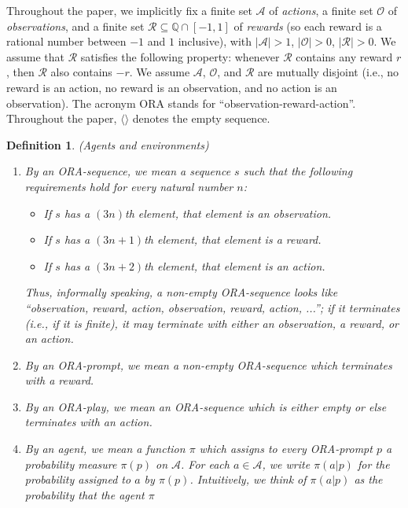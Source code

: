 \documentclass{article}
\newtheorem{definition}[theorem]{Definition}
\begin{document}
Throughout the paper, we implicitly
fix a finite set $\mathcal A$ of \emph{actions},
a finite set $\mathcal O$ of \emph{observations},
and a finite set $\mathcal R\subseteq \mathbb Q\cap [-1,1]$ of \emph{rewards}
(so each reward is a rational number between $-1$ and $1$ inclusive),
with $|\mathcal A|>1$,
$|\mathcal O|>0$, $|\mathcal R|>0$.
We assume that $\mathcal R$ satisfies the following property:
whenever $\mathcal R$ contains any reward $r$, then $\mathcal R$
also contains $-r$.
We assume $\mathcal A$, $\mathcal O$, and $\mathcal R$ are mutually disjoint
(i.e., no reward is an action, no reward is an observation, and no action is an
observation).
The acronym ORA stands for ``observation-reward-action''.
Throughout the paper, $\langle\rangle$ denotes the empty sequence.

\begin{definition}
    (Agents and environments)
    \begin{enumerate}
        \item
        By an \emph{ORA-sequence}, we mean a sequence $s$ such that the following requirements
        hold for every natural number $n$:
        \begin{itemize}
            \item If $s$ has a $(3n)$th element, that element is an observation.
            \item If $s$ has a $(3n+1)$th element, that element is a reward.
            \item If $s$ has a $(3n+2)$th element, that element is an action.
        \end{itemize}
        Thus, informally speaking, a non-empty ORA-sequence
        looks like ``observation, reward, action, observation, reward, action, ...'';
        if it terminates (i.e., if it is finite), it may terminate with
        either an observation, a reward, or an action.
        \item
        By an \emph{ORA-prompt}, we mean a non-empty ORA-sequence which
        terminates with a reward.
        \item
        By an \emph{ORA-play}, we mean an ORA-sequence which is either empty or else
        terminates with an action.
        \item
        By an \emph{agent}, we mean a function $\pi$ which assigns to every
        ORA-prompt $p$ a probability measure $\pi(p)$ on $\mathcal A$.
        For each $a\in\mathcal A$,
        we write $\pi(a|p)$ for the probability assigned to $a$ by $\pi(p)$.
        Intuitively, we think of $\pi(a|p)$ as the probability that the agent $\pi$

\end{enumerate}
\end{definition}
\end{document}

